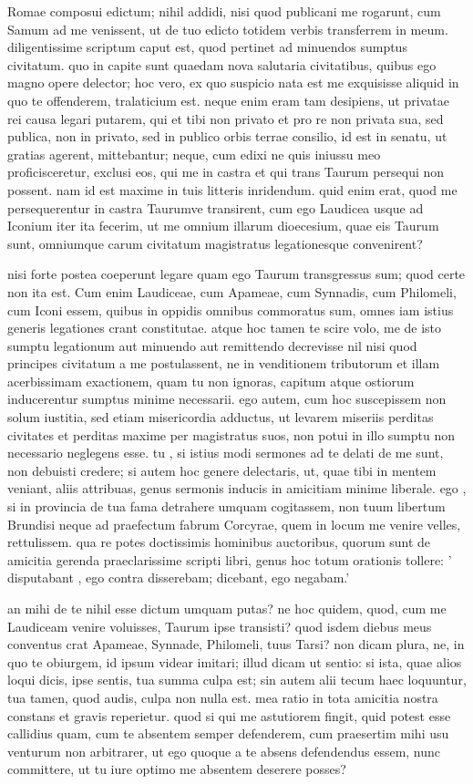  Romae composui edictum; nihil addidi, nisi quod publicani me rogarunt, cum Samum ad me venissent, ut de tuo edicto totidem verbis transferrem in meum. diligentissime scriptum caput est, quod pertinet ad minuendos sumptus civitatum. quo in capite sunt quaedam nova salutaria civitatibus, quibus ego magno opere delector; hoc vero, ex quo suspicio nata est me exquisisse aliquid in quo te offenderem, tralaticium est. neque enim eram tam desipiens, ut privatae rei causa legari putarem, qui et tibi non privato et pro re non privata sua, sed publica, non in privato, sed in publico orbis terrae consilio, id est in senatu, ut gratias agerent, mittebantur; neque, cum edixi ne quis iniussu meo proficisceretur, exclusi eos, qui me in castra et qui trans Taurum persequi non possent. nam id est maxime in tuis litteris inridendum. quid enim erat, quod me persequerentur in castra Taurumve transirent, cum ego Laudicea usque ad Iconium iter ita fecerim, ut me omnium illarum dioecesium, quae eis Taurum sunt, omniumque carum civitatum magistratus legationesque convenirent?

 nisi forte postea coeperunt legare quam ego Taurum transgressus sum; quod certe non ita est. Cum enim Laudiceae, cum Apameae, cum Synnadis, cum Philomeli, cum Iconi essem, quibus in oppidis omnibus commoratus sum, omnes iam istius generis legationes crant constitutae. atque hoc tamen te scire volo, me de isto sumptu legationum aut minuendo aut remittendo decrevisse nil nisi quod principes civitatum a me postulassent, ne in venditionem tributorum et illam acerbissimam exactionem, quam tu non ignoras, capitum atque ostiorum inducerentur sumptus minime necessarii. ego autem, cum hoc suscepissem non solum iustitia, sed etiam misericordia adductus, ut levarem miseriis perditas civitates et perditas maxime per magistratus suos, non potui in illo sumptu non necessario neglegens esse. tu , si istius modi sermones ad te delati de me sunt, non debuisti credere; si autem hoc genere delectaris, ut, quae tibi in mentem veniant, aliis attribuas, genus sermonis inducis in amicitiam minime liberale. ego , si in provincia de tua fama detrahere umquam cogitassem, non tuum libertum Brundisi neque ad praefectum fabrum Corcyrae, quem in locum me venire velles, rettulissem. qua re potes doctissimis hominibus auctoribus, quorum sunt de amicitia gerenda praeclarissime scripti libri, genus hoc totum orationis tollere: ' disputabant , ego contra disserebam; dicebant, ego negabam.'

 an mihi de te nihil esse dictum umquam putas? ne hoc quidem, quod, cum me Laudiceam venire voluisses, Taurum ipse transisti? quod isdem diebus meus conventus crat Apameae, Synnade, Philomeli, tuus Tarsi? non dicam plura, ne, in quo te obiurgem, id ipsum videar imitari; illud dicam ut sentio: si ista, quae alios loqui dicis, ipse sentis, tua summa culpa est; sin autem alii tecum haec loquuntur, tua tamen, quod audis, culpa non nulla est. mea ratio in tota amicitia nostra constans et gravis reperietur. quod si qui me astutiorem fingit, quid potest esse callidius quam, cum te absentem semper defenderem, cum praesertim mihi usu venturum non arbitrarer, ut ego quoque a te absens defendendus essem, nunc committere, ut tu iure optimo me absentem deserere posses?

